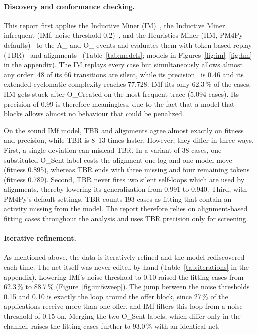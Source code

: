 \documentclass[
  english,        %
  font=times,     %
  twocolumn,      %
]{tumarticle}
\begin{document}
\paragraph{Discovery and conformance checking.}
This report first applies the Inductive Miner (IM)~\cite{leemans2013im}, the Inductive Miner infrequent (IMf, noise threshold 0.2)~\cite{leemans2014imf}, and the Heuristics Miner (HM, PM4Py defaults)~\cite{weijters2006hm} to the A\_ and O\_ events and evaluates them with token-based replay (TBR)~\cite{rozinat2008tbr} and alignments~\cite{adriansyah2011align} (Table~\ref{tab:models}; models in Figures~\ref{fig:im}--\ref{fig:hm} in the appendix). The IM replays every case but simultaneously allows almost any order: 48 of its 66 transitions are silent, while its precision~\cite{munozgama2010etc} is 0.46 and its extended cyclomatic complexity reaches 77,728. IMf fits only 62.3\,\% of the cases. HM
gets stuck after O\_Created on the most frequent trace (5,094 cases). Its precision of 0.99 is therefore meaningless, due to the fact that a model that blocks allows almost no behaviour that could be penalized.

On the sound IMf model, TBR and alignments agree almost exactly on fitness and precision, while TBR is 8--13 times faster. However, they differ in three ways. First, a single deviation can mislead TBR. In a variant of 38 cases, one substituted O\_Sent label costs the alignment one log and one model move (fitness 0.895), whereas TBR ends with three missing and four remaining tokens (fitness 0.789). Second, TBR never fires two silent self-loops which are used by alignments, thereby lowering its generalization from 0.991 to 0.940. Third, with PM4Py's default settings, TBR counts 193 cases as fitting that contain an activity missing from the model. The report therefore relies on alignment-based fitting cases throughout the analysis and uses TBR precision only for screening. 

\paragraph{Iterative refinement.}
As mentioned above, the data is iteratively refined and the model rediscovered each time. The net itself was never edited by hand (Table~\ref{tab:iterations} in the appendix). Lowering IMf's noise threshold to 0.10 raised the fitting cases from 62.3\,\% to 88.7\,\% (Figure~\ref{fig:imfsweep}). The jump between the noise thresholds 0.15 and 0.10 is exactly the loop around the offer block, since 27\,\% of the applications receive more than one offer, and IMf filters this loop from a noise threshold of 0.15 on. Merging the two O\_Sent labels, which differ only in the channel, raises the fitting cases further to 93.0\,\% with an identical net. 
\end{document}
